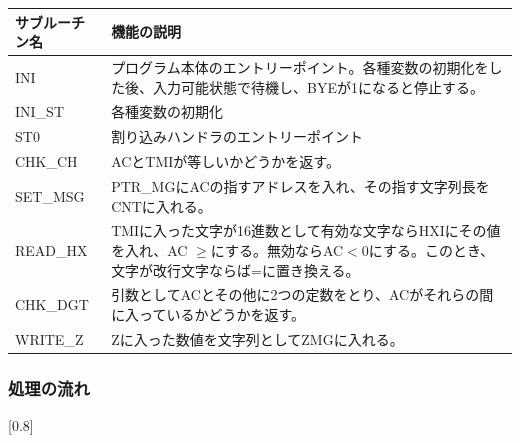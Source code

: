 \documentclass[dvipdfmx,12pt]{jreport}
\begin{document}
\begin{table}[h]
  \begin{tabular}{|l|p{10cm}|} \hline
    サブルーチン名 & 機能の説明 \\ \hline
    INI & プログラム本体のエントリーポイント。各種変数の初期化をした後、入力可能状態で待機し、BYEが1になると停止する。 \\ \hline
    INI\_ST & 各種変数の初期化 \\ \hline
    ST0 & 割り込みハンドラのエントリーポイント \\ \hline
    CHK\_CH & ACとTMIが等しいかどうかを返す。 \\ \hline
    SET\_MSG & PTR\_MGにACの指すアドレスを入れ、その指す文字列長をCNTに入れる。 \\ \hline
    READ\_HX & TMIに入った文字が16進数として有効な文字ならHXIにその値を入れ、AC $\geq$にする。無効ならAC$<$0にする。このとき、文字が改行文字ならば=に置き換える。 \\ \hline
    CHK\_DGT & 引数としてACとその他に2つの定数をとり、ACがそれらの間に入っているかどうかを返す。 \\ \hline
    WRITE\_Z & Zに入った数値を文字列としてZMGに入れる。\\ \hline
  \end{tabular}
\end{table}

\subsubsection{処理の流れ}
\scalebox{0.8}[0.8]{
  }
\end{document}

